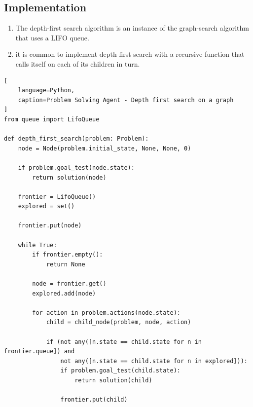 \subsection*{Implementation}

\begin{enumerate}
    \item The depth-first search algorithm is an instance of the graph-search algorithm that uses a LIFO queue.
    \hfill \cite{ai/book/Artificial-Intelligence-A-Modern-Approach/Russell-Norvig}

    \item  it is common to implement depth-first search with a recursive function that calls itself  on each of its children in turn.
    \hfill \cite{ai/book/Artificial-Intelligence-A-Modern-Approach/Russell-Norvig}
\end{enumerate}

\begin{lstlisting}[
    language=Python,
    caption=Problem Solving Agent - Depth first search on a graph
]
from queue import LifoQueue

def depth_first_search(problem: Problem):
    node = Node(problem.initial_state, None, None, 0)

    if problem.goal_test(node.state):
        return solution(node)

    frontier = LifoQueue()
    explored = set()

    frontier.put(node)

    while True:
        if frontier.empty():
            return None

        node = frontier.get()
        explored.add(node)

        for action in problem.actions(node.state):
            child = child_node(problem, node, action)

            if (not any([n.state == child.state for n in frontier.queue]) and
                not any([n.state == child.state for n in explored])):
                if problem.goal_test(child.state):
                    return solution(child)

                frontier.put(child)
\end{lstlisting}














